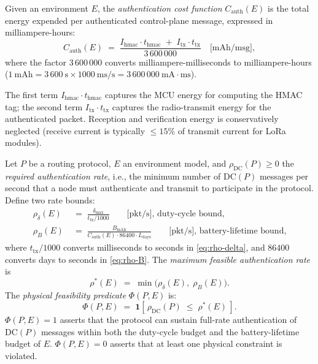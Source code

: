 \begin{definition}
\label{def:auth-cost}
Given an environment $E$, the \emph{authentication cost function}
$C_{\mathrm{auth}}(E)$ is the total energy expended per authenticated
control-plane message, expressed in milliampere-hours:
\[
  C_{\mathrm{auth}}(E)
  \;=\;
  \frac{I_{\mathrm{hmac}} \cdot t_{\mathrm{hmac}}
        \;+\; I_{\mathrm{tx}} \cdot t_{\mathrm{tx}}}{3\,600\,000}
  \quad \text{[mAh/msg]},
\]
where the factor $3\,600\,000$ converts milliampere-milliseconds to
milliampere-hours
($1\ \mathrm{mAh} = 3\,600\ \mathrm{s} \times 1000\ \mathrm{ms/s}
  = 3\,600\,000\ \mathrm{mA{\cdot}ms}$).

The first term $I_{\mathrm{hmac}} \cdot t_{\mathrm{hmac}}$ captures the
MCU energy for computing the HMAC tag; the second term
$I_{\mathrm{tx}} \cdot t_{\mathrm{tx}}$ captures the radio-transmit energy
for the authenticated packet.  Reception and verification energy is
conservatively neglected (receive current is typically $\le 15\%$ of
transmit current for LoRa modules).
\end{definition}

\begin{definition}
\label{def:feasibility}
Let $P$ be a routing protocol, $E$ an environment model, and
$\rho_{\mathrm{DC}}(P) \ge 0$ the \emph{required authentication rate},
i.e., the minimum number of $\mathrm{DC}(P)$ messages per second that a
node must authenticate and transmit to participate in the protocol.
Define two rate bounds:
\begin{align}
  \rho_{\delta}(E) &\;=\; \frac{\delta_{\max}}{t_{\mathrm{tx}}/1000}
    \qquad \text{[pkt/s], duty-cycle bound,}
    \label{eq:rho-delta}\\[4pt]
  \rho_{B}(E)       &\;=\; \frac{B_{\mathrm{mAh}}}
                              {C_{\mathrm{auth}}(E) \cdot 86400 \cdot L_{\mathrm{days}}}
    \qquad \text{[pkt/s], battery-lifetime bound,}
    \label{eq:rho-B}
\end{align}
where $t_{\mathrm{tx}}/1000$ converts milliseconds to seconds in
\eqref{eq:rho-delta}, and $86400$ converts days to seconds in
\eqref{eq:rho-B}.
The \emph{maximum feasible authentication rate} is
\[
  \rho^*(E) \;=\; \min\!\bigl(\rho_{\delta}(E),\; \rho_{B}(E)\bigr).
\]
The \emph{physical feasibility predicate} $\Phi(P, E)$ is:
\[
  \Phi(P, E) \;=\; \mathbf{1}\!\left[\,\rho_{\mathrm{DC}}(P) \;\le\; \rho^*(E)\,\right].
\]
$\Phi(P, E) = 1$ asserts that the protocol can sustain full-rate
authentication of $\mathrm{DC}(P)$ messages within both the
duty-cycle budget and the battery-lifetime budget of $E$.
$\Phi(P, E) = 0$ asserts that at least one physical constraint is
violated.
\end{definition}

